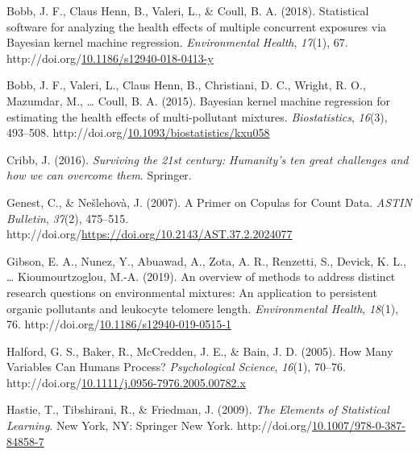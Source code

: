 \documentclass[12pt, twoside]{amherstthesis}
\newenvironment{CSLReferences}[2]%
  {}%
  {\par}
\begin{document}
\begin{CSLReferences}{1}{0}
\leavevmode{}%
Bobb, J. F., Claus Henn, B., Valeri, L., \& Coull, B. A. (2018). Statistical software for analyzing the health effects of multiple concurrent exposures via {Bayesian} kernel machine regression. \emph{Environmental Health}, \emph{17}(1), 67. http://doi.org/\href{https://doi.org/10.1186/s12940-018-0413-y}{10.1186/s12940-018-0413-y}

\leavevmode{}%
Bobb, J. F., Valeri, L., Claus Henn, B., Christiani, D. C., Wright, R. O., Mazumdar, M., \ldots{} Coull, B. A. (2015). Bayesian kernel machine regression for estimating the health effects of multi-pollutant mixtures. \emph{Biostatistics}, \emph{16}(3), 493--508. http://doi.org/\href{https://doi.org/10.1093/biostatistics/kxu058}{10.1093/biostatistics/kxu058}

\leavevmode{}%
Cribb, J. (2016). \emph{Surviving the 21st century: {Humanity}'s ten great challenges and how we can overcome them}. Springer.

\leavevmode{}%
Genest, C., \& Nešlehovà, J. (2007). A {Primer} on {Copulas} for {Count} {Data}. \emph{ASTIN Bulletin}, \emph{37}(2), 475--515. http://doi.org/\url{https://doi.org/10.2143/AST.37.2.2024077}

\leavevmode{}%
Gibson, E. A., Nunez, Y., Abuawad, A., Zota, A. R., Renzetti, S., Devick, K. L., \ldots{} Kioumourtzoglou, M.-A. (2019). An overview of methods to address distinct research questions on environmental mixtures: An application to persistent organic pollutants and leukocyte telomere length. \emph{Environmental Health}, \emph{18}(1), 76. http://doi.org/\href{https://doi.org/10.1186/s12940-019-0515-1}{10.1186/s12940-019-0515-1}

\leavevmode{}%
Halford, G. S., Baker, R., McCredden, J. E., \& Bain, J. D. (2005). How {Many} {Variables} {Can} {Humans} {Process}? \emph{Psychological Science}, \emph{16}(1), 70--76. http://doi.org/\href{https://doi.org/10.1111/j.0956-7976.2005.00782.x}{10.1111/j.0956-7976.2005.00782.x}

\leavevmode{}%
Hastie, T., Tibshirani, R., \& Friedman, J. (2009). \emph{The {Elements} of {Statistical} {Learning}}. New York, NY: Springer New York. http://doi.org/\href{https://doi.org/10.1007/978-0-387-84858-7}{10.1007/978-0-387-84858-7}


\end{CSLReferences}
\end{document}
